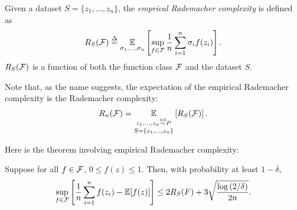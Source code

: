 \begin{definition}
Given a dataset $S = \{z_1, \dots, z_n\}$, the \textit{emprical Rademacher complexity} is defined as
\begin{equation}
R_S(\mathcal F) \overset{\Delta}{=} \operatorname*{\mathbb{E}}_{\sigma_1,\dots, \sigma_n} \left[ \sup_{f\in \mathcal F} \frac{1}{n} \sum^n_{i=1} \sigma_i f(z_i) \right].
\end{equation}
$R_S(\mathcal F)$ is a function of both the function class $\mathcal F$ and the dataset $S$.
\end{definition}

Note that, as the name suggests, the expectation of the empirical Rademacher complexity is the Rademacher complexity:
\begin{align}
    R_n(\mathcal F) = \underset{S=\{z_1,\dots, z_n\}}{\underset{z_1, \dots, z_n \overset{\textup{iid}}{\sim} P}{\operatorname*{\mathbb{E}}}}\left[ R_S(\mathcal F) \right].
\end{align}


Here is the theorem involving empirical Rademacher complexity:

\begin{theorem}\label{lec5:thm:thm2}
    Suppose for all $f \in \mathcal F$, $0 \leq f(z) \leq 1$. Then, with probability at least $1-\delta$,
    \begin{align}
        \sup_{f\in \mathcal F} \left[ \frac{1}{n} \sum^n_{i=1} f(z_i) - \operatorname*{\mathbb{E}}[f(z)] \right] \leq 2 R_S(F) + 3\sqrt{\frac{\log{(2/\delta)}}{2n}}.
    \end{align}
\end{theorem}

